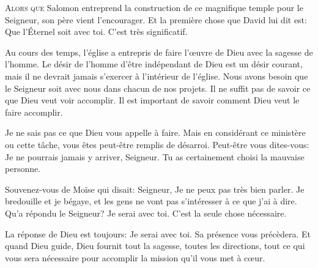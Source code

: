

\lettrine{A}{lors que} Salomon entreprend la construction
 de ce magnifique temple pour le Seigneur, son père vient l'encourager.
 Et la première chose que David lui dit est:
 \Og Que l'Éternel soit avec toi. \Fg{} C'est très significatif. 

Au cours des temps, l'église 
 a entrepris de faire l'\oe{}uvre de Dieu
 avec la sagesse de l'homme. Le désir de l'homme d'être indépendant de Dieu
 est un désir courant, mais il ne devrait jamais s'exercer
 à l'intérieur de l'église.
 Nous avons besoin que le Seigneur soit avec nous dans chacun de nos projets.
 Il ne suffit pas de savoir ce que Dieu veut voir accomplir.
 Il est important de savoir comment Dieu veut le faire accomplir. 


Je ne sais pas ce que Dieu vous appelle à faire.
 Mais en considérant ce ministère ou cette tâche,
 vous êtes peut-être remplis de désarroi. Peut-être vous dites-vous:
 \Og Je ne pourrais jamais y arriver, Seigneur.
 Tu as certainement choisi la mauvaise personne. \Fg{}

Souvenez-vous de Moïse qui disait:
 \Og Seigneur, Je ne peux pas très bien parler. Je bredouille et je bégaye,
 et les gens ne vont pas s'intéresser à ce que j'ai à dire. \Fg{}
 Qu'a répondu le Seigneur? \Og Je serai avec toi. \Fg{}
 C'est la seule chose nécessaire.

La réponse de Dieu est toujours: \Og Je serai avec toi. \Fg{}
 Sa présence vous précèdera.
 Et quand Dieu guide, Dieu fournit tout la sagesse, toutes les directions,
 tout ce qui vous sera nécessaire pour accomplir
 la mission qu'il vous met à c\oe{}ur.

\dvrule






